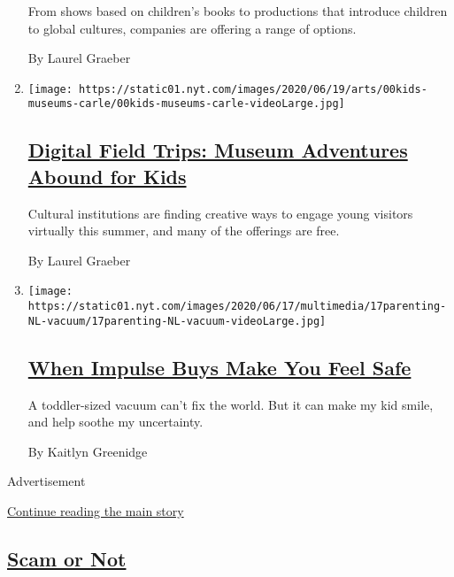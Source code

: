 \begin{enumerate}
  From shows based on children's books to productions that introduce
  children to global cultures, companies are offering a range of
  options.

  By Laurel Graeber
\item
  \texttt{[image: https://static01.nyt.com/images/2020/06/19/arts/00kids-museums-carle/00kids-museums-carle-videoLarge.jpg]}

  \hypertarget{digital-field-trips-museum-adventures-abound-for-kids}{%
  \subsection{\texorpdfstring{\href{/2020/06/18/arts/design/kids-museums-summer-virus.html}{Digital
  Field Trips: Museum Adventures Abound for
  Kids}}{Digital Field Trips: Museum Adventures Abound for Kids}}\label{digital-field-trips-museum-adventures-abound-for-kids}}

  Cultural institutions are finding creative ways to engage young
  visitors virtually this summer, and many of the offerings are free.

  By Laurel Graeber
\item
  \texttt{[image: https://static01.nyt.com/images/2020/06/17/multimedia/17parenting-NL-vacuum/17parenting-NL-vacuum-videoLarge.jpg]}

  \hypertarget{when-impulse-buys-make-you-feel-safe}{%
  \subsection{\texorpdfstring{\href{/2020/06/17/parenting/virus-impulse-buys.html}{When
  Impulse Buys Make You Feel
  Safe}}{When Impulse Buys Make You Feel Safe}}\label{when-impulse-buys-make-you-feel-safe}}

  A toddler-sized vacuum can't fix the world. But it can make my kid
  smile, and help soothe my uncertainty.

  By Kaitlyn Greenidge
\end{enumerate}

Advertisement

\protect\hyperlink{after-mid2}{Continue reading the main story}

\hypertarget{scam-or-not}{%
\subsection{\texorpdfstring{\href{/column/scam-or-not}{Scam or
Not}}{Scam or Not}}\label{scam-or-not}}

